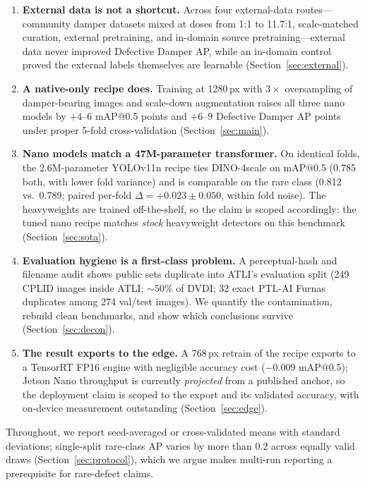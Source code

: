 \documentclass[conference]{IEEEtran}
\makeatletter
\newcommand{\dd}{Defective Damper}
\newcommand{\map}{mAP@0.5}
\makeatother
\begin{document}
\begin{enumerate}
\item \textbf{External data is not a shortcut.} Across four external-data routes---community damper datasets mixed at doses from 1:1 to 11.7:1, scale-matched curation, external pretraining, and in-domain source pretraining---external data never improved \dd{} AP, while an in-domain control proved the external labels themselves are learnable (Section~\ref{sec:external}).
\item \textbf{A native-only recipe does.} Training at 1280\,px with $3\times$ oversampling of damper-bearing images and scale-down augmentation raises all three nano models by $+4$--$6$ \map{} points and $+6$--$9$ \dd{} AP points under proper 5-fold cross-validation (Section~\ref{sec:main}).
\item \textbf{Nano models match a 47M-parameter transformer.} On identical folds, the 2.6M-parameter YOLOv11n recipe ties DINO-4scale on \map{} (0.785 both, with lower fold variance) and is comparable on the rare class (0.812 vs.\ 0.789; paired per-fold $\Delta{=}{+}0.023\pm0.050$, within fold noise). The heavyweights are trained off-the-shelf, so the claim is scoped accordingly: the tuned nano recipe matches \emph{stock} heavyweight detectors on this benchmark (Section~\ref{sec:sota}).
\item \textbf{Evaluation hygiene is a first-class problem.} A perceptual-hash and filename audit shows public sets duplicate into ATLI's evaluation split (249 CPLID images inside ATLI; ${\sim}50\%$ of DVDI; 32 exact PTL-AI Furnas duplicates among 274 val/test images). We quantify the contamination, rebuild clean benchmarks, and show which conclusions survive (Section~\ref{sec:decon}).
\item \textbf{The result exports to the edge.} A 768\,px retrain of the recipe exports to a TensorRT FP16 engine with negligible accuracy cost ($-0.009$ \map{}); Jetson Nano throughput is currently \emph{projected} from a published anchor, so the deployment claim is scoped to the export and its validated accuracy, with on-device measurement outstanding (Section~\ref{sec:edge}).
\end{enumerate}

Throughout, we report seed-averaged or cross-validated means with standard deviations; single-split rare-class AP varies by more than $0.2$ across equally valid draws (Section~\ref{sec:protocol}), which we argue makes multi-run reporting a prerequisite for rare-defect claims.
\end{document}
